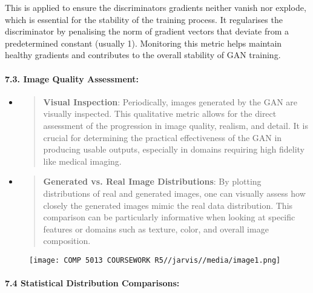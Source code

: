 \documentclass[
]{article}
\begin{document}
This is applied to ensure the discriminator\textquotesingle s gradients
neither vanish nor explode, which is essential for the stability of the
training process. It regularises the discriminator by penalising the
norm of gradient vectors that deviate from a predetermined constant
(usually 1). Monitoring this metric helps maintain healthy gradients and
contributes to the overall stability of GAN training.

\hypertarget{image-quality-assessment}{%
\paragraph{\texorpdfstring{\textbf{7.3. Image Quality
Assessment:}}{7.3. Image Quality Assessment:}}\label{image-quality-assessment}}

\begin{itemize}
\item
  \begin{quote}
  \textbf{Visual Inspection}: Periodically, images generated by the GAN
  are visually inspected. This qualitative metric allows for the direct
  assessment of the progression in image quality, realism, and detail.
  It is crucial for determining the practical effectiveness of the GAN
  in producing usable outputs, especially in domains requiring high
  fidelity like medical imaging.
  \end{quote}
\item
  \begin{quote}
  \textbf{Generated vs. Real Image Distributions}: By plotting
  distributions of real and generated images, one can visually assess
  how closely the generated images mimic the real data distribution.
  This comparison can be particularly informative when looking at
  specific features or domains such as texture, color, and overall image
  composition.
  \end{quote}
\end{itemize}

\begin{figure}
    \centering
    \texttt{[image: COMP 5013 COURSEWORK R5//jarvis//media/image1.png]}


\end{figure}

\hypertarget{statistical-distribution-comparisons}{%
\paragraph{\texorpdfstring{\textbf{7.4 Statistical Distribution
Comparisons:}}{7.4 Statistical Distribution Comparisons:}}\label{statistical-distribution-comparisons}}
\end{document}
